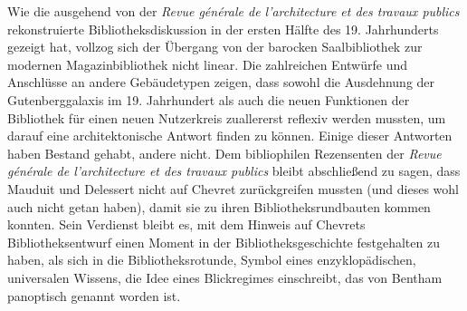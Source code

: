 Wie die ausgehend von der \emph{Revue générale de l'architecture et des
travaux publics} rekonstruierte Bibliotheksdiskussion in der ersten
Hälfte des 19. Jahrhunderts gezeigt hat, vollzog sich der Übergang von
der barocken Saalbibliothek zur modernen Magazinbibliothek nicht linear.
Die zahlreichen Entwürfe und Anschlüsse an andere Gebäudetypen zeigen,
dass sowohl die Ausdehnung der Gutenberggalaxis im 19. Jahrhundert als
auch die neuen Funktionen der Bibliothek für einen neuen Nutzerkreis
zuallererst reflexiv werden mussten, um darauf eine architektonische
Antwort finden zu können. Einige dieser Antworten haben Bestand gehabt,
andere nicht. Dem bibliophilen Rezensenten der \emph{Revue générale de
l'architecture et des travaux publics} bleibt abschließend zu sagen,
dass Mauduit und Delessert nicht auf Chevret zurückgreifen mussten (und
dieses wohl auch nicht getan haben), damit sie zu ihren
Bibliotheksrundbauten kommen konnten. Sein Verdienst bleibt es, mit dem
Hinweis auf Chevrets Bibliotheksentwurf einen Moment in der
Bibliotheksgeschichte festgehalten zu haben, als sich in die
Bibliotheksrotunde, Symbol eines enzyklopädischen, universalen Wissens,
die Idee eines Blickregimes einschreibt, das von Bentham panoptisch
genannt worden ist. 
